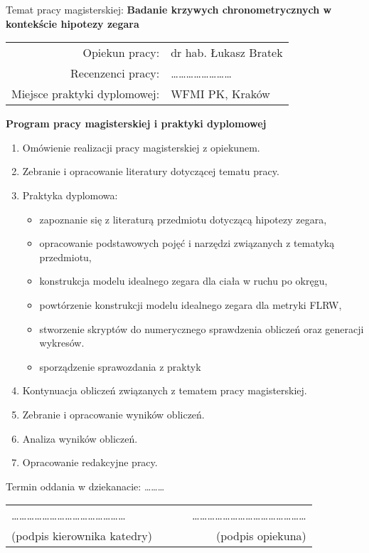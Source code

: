 Temat pracy magisterskiej:
{\bf Badanie krzywych chronometrycznych w kontekście hipotezy zegara}\\

\begin{tabular}{rl}

Opiekun pracy:                  & dr hab. Łukasz Bratek\\
Recenzenci pracy:               & \dots \dots \dots \dots \dots \dots \dots \dots\\
Miejsce praktyki dyplomowej:    & WFMI PK, Kraków\\
\end{tabular}

\begin{center}
{\bf Program pracy magisterskiej i praktyki dyplomowej}
\end{center}

\begin{enumerate}
\item Omówienie realizacji pracy magisterskiej z opiekunem.
\item Zebranie i opracowanie literatury dotyczącej tematu pracy.
\item Praktyka dyplomowa:
\begin{itemize}
\item zapoznanie się z literaturą przedmiotu dotyczącą hipotezy zegara,
\item opracowanie podstawowych pojęć i narzędzi związanych z tematyką przedmiotu,
\item konstrukcja modelu idealnego zegara dla ciała w ruchu po okręgu,
\item powtórzenie konstrukcji modelu idealnego zegara dla metryki FLRW,
\item stworzenie skryptów do numerycznego sprawdzenia obliczeń oraz generacji wykresów.
\item sporządzenie sprawozdania z praktyk
\end{itemize}
\item Kontynuacja obliczeń związanych z tematem pracy magisterskiej.
\item Zebranie i opracowanie wyników obliczeń.
\item Analiza wyników obliczeń.
\item Opracowanie redakcyjne pracy.
\end{enumerate}


\noindent
Termin oddania w dziekanacie: \dots \dots \dots\\[1cm]

\begin{center}
\begin{tabular}{lcr}
\dots\dots\dots\dots\dots\dots\dots\dots\dots\dots\dots\dots\dots\dots\dots & ~~~ &
\dots\dots\dots\dots\dots\dots\dots\dots\dots\dots\dots\dots\dots\dots\dots \\
(podpis kierownika katedry) & & (podpis opiekuna) \\
\end{tabular}
\end{center}

